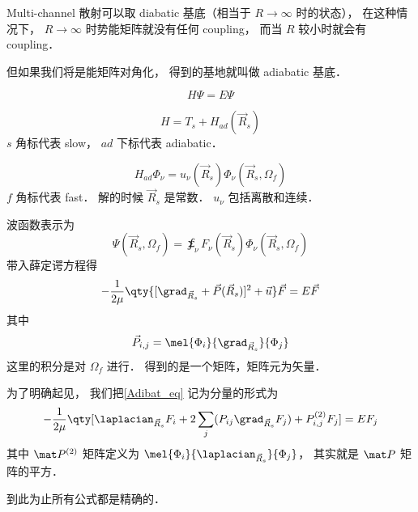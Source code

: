 
Multi-channel 散射可以取 diabatic 基底（相当于 $R\to \infty$ 时的状态）， 在这种情况下， $R\to\infty$ 时势能矩阵就没有任何 coupling， 而当 $R$ 较小时就会有 coupling．

但如果我们将是能矩阵对角化， 得到的基地就叫做 adiabatic 基底．

\begin{equation}
H \Psi = E \Psi
\end{equation}

\begin{equation}
H = T_s + H_{ad}(\vec R_s)
\end{equation}
$s$ 角标代表 slow， $ad$ 下标代表 adiabatic．

\begin{equation}
H_{ad} \Phi_\nu = u_\nu (\vec R_s) \Phi_\nu (\vec R_s, \Omega_f)
\end{equation}
$f$ 角标代表 fast． 解的时候 $\vec R_s$ 是常数． $u_\nu$ 包括离散和连续．

波函数表示为
\begin{equation}
\Psi(\vec R_s, \Omega_f) = \sumint_\nu F_\nu (\vec R_s) \Phi_\nu(\vec R_s, \Omega_f)
\end{equation}
带入薛定谔方程得
\begin{equation}\label{Adibat_eq}
-\frac{1}{2\mu} \qty{[\grad_{\vec R_s} + \vec P(\vec R_s)]^2 + \vec u} \vec F = E \vec F
\end{equation}
其中
\begin{equation}
\vec P_{i,j} = \mel{\Phi_i}{\grad_{\vec R_s}}{\Phi_j}
\end{equation}
这里的积分是对 $\Omega_f$ 进行． 得到的是一个矩阵，矩阵元为矢量．

为了明确起见， 我们把\autoref{Adibat_eq} 记为分量的形式为
\begin{equation}
-\frac{1}{2\mu} \qty[\laplacian_{\vec R_s} F_i + 2\sum_j ( P_{ij} \grad_{\vec R_s} F_j) + P_{i,j}^{(2)} F_j] = E F_j
\end{equation}
其中 $\mat P^{(2)}$ 矩阵定义为 $\mel{\Phi_i}{\laplacian_{\vec R_s}}{\Phi_j}$， 其实就是 $\mat P$ 矩阵的平方．

到此为止所有公式都是精确的．
